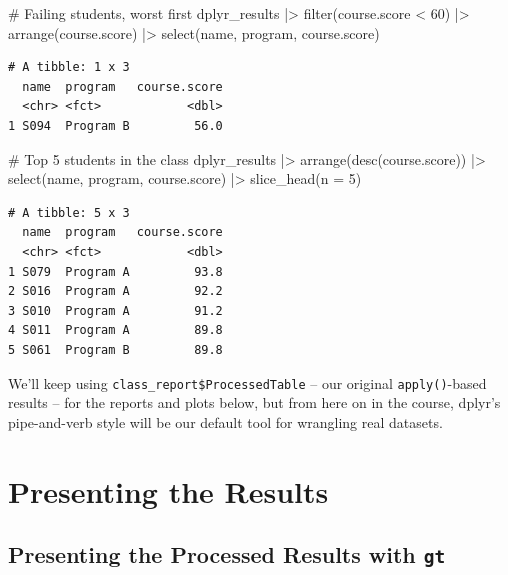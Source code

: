 \documentclass[
  letterpaper,
  DIV=11,
  numbers=noendperiod]{scrreprt}
\newenvironment{Shaded}{\begin{snugshade}}{\end{snugshade}}
\newcommand{\AttributeTok}[1]{\textcolor[rgb]{0.40,0.45,0.13}{#1}}
\newcommand{\CommentTok}[1]{\textcolor[rgb]{0.37,0.37,0.37}{#1}}
\newcommand{\DecValTok}[1]{\textcolor[rgb]{0.68,0.00,0.00}{#1}}
\newcommand{\FunctionTok}[1]{\textcolor[rgb]{0.28,0.35,0.67}{#1}}
\newcommand{\NormalTok}[1]{\textcolor[rgb]{0.00,0.23,0.31}{#1}}
\newcommand{\SpecialCharTok}[1]{\textcolor[rgb]{0.37,0.37,0.37}{#1}}
\begin{document}
\begin{Shaded}
\begin{Highlighting}[]
\CommentTok{\# Failing students, worst first}
\NormalTok{dplyr\_results }\SpecialCharTok{|\textgreater{}}
    \FunctionTok{filter}\NormalTok{(course.score }\SpecialCharTok{\textless{}} \DecValTok{60}\NormalTok{) }\SpecialCharTok{|\textgreater{}}
    \FunctionTok{arrange}\NormalTok{(course.score) }\SpecialCharTok{|\textgreater{}}
    \FunctionTok{select}\NormalTok{(name, program, course.score)}
\end{Highlighting}
\end{Shaded}

\begin{verbatim}
# A tibble: 1 x 3
  name  program   course.score
  <chr> <fct>            <dbl>
1 S094  Program B         56.0
\end{verbatim}

\begin{Shaded}
\begin{Highlighting}[]
\CommentTok{\# Top 5 students in the class}
\NormalTok{dplyr\_results }\SpecialCharTok{|\textgreater{}}
    \FunctionTok{arrange}\NormalTok{(}\FunctionTok{desc}\NormalTok{(course.score)) }\SpecialCharTok{|\textgreater{}}
    \FunctionTok{select}\NormalTok{(name, program, course.score) }\SpecialCharTok{|\textgreater{}}
    \FunctionTok{slice\_head}\NormalTok{(}\AttributeTok{n =} \DecValTok{5}\NormalTok{)}
\end{Highlighting}
\end{Shaded}

\begin{verbatim}
# A tibble: 5 x 3
  name  program   course.score
  <chr> <fct>            <dbl>
1 S079  Program A         93.8
2 S016  Program A         92.2
3 S010  Program A         91.2
4 S011  Program A         89.8
5 S061  Program B         89.8
\end{verbatim}

We'll keep using \texttt{class\_report\$ProcessedTable} -- our original
\texttt{apply()}-based results -- for the reports and plots below, but
from here on in the course, dplyr's pipe-and-verb style will be our
default tool for wrangling real datasets.

\section{Presenting the Results}\label{presenting-the-results}

\subsection{\texorpdfstring{Presenting the Processed Results with
\texttt{gt}}{Presenting the Processed Results with gt}}\label{presenting-the-processed-results-with-gt}
\end{document}
